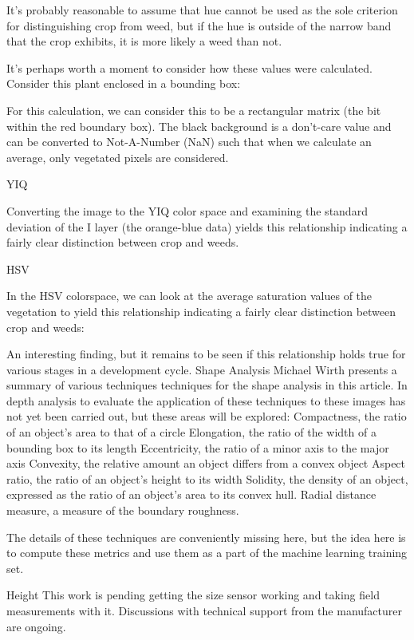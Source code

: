 \documentclass[letterpaper]{article}
\begin{document}
It’s probably reasonable to assume that hue cannot be used as the sole criterion for distinguishing crop from weed, but if the hue is outside of the narrow band that the crop exhibits, it is more likely a weed than not.

It’s perhaps worth a moment to consider how these values were calculated.  Consider this plant enclosed in a bounding box:



For this calculation, we can consider this to be a rectangular matrix (the bit within the red boundary box). The black background is a don’t-care value and can be converted to Not-A-Number (NaN) such that when we calculate an average, only vegetated pixels are considered.

YIQ

Converting the image to the YIQ color space and examining the standard deviation of the I layer (the orange-blue data) yields this relationship indicating a fairly clear distinction between crop and weeds.



HSV

In the HSV colorspace, we can look at the average saturation values of the vegetation to yield this relationship indicating a fairly clear distinction between crop and weeds:



An interesting finding, but it remains to be seen if this relationship holds true for various stages in a development cycle.
Shape Analysis
Michael Wirth presents a summary of various techniques techniques for the shape analysis in this article. In depth analysis to evaluate the application of these techniques to these images has not yet been carried out, but these areas will be explored:
Compactness, the ratio of an object’s area to that of a circle
Elongation, the ratio of the width of a bounding box to its length
Eccentricity, the ratio of a minor axis to the major axis
Convexity, the relative amount an object differs from a convex object
Aspect ratio, the ratio of an object’s height to its width
Solidity, the density of an object, expressed as the ratio of an object’s area to its convex hull.
Radial distance measure, a measure of the boundary roughness.

The details of these techniques are conveniently missing here, but the idea here is to compute these metrics and use them as a part of the machine learning training set.

Height
This work is pending getting the size sensor working and taking field measurements with it. Discussions with technical support from the manufacturer are ongoing.
\end{document}
